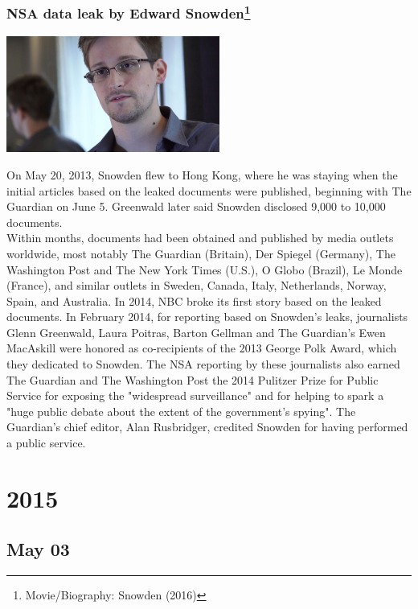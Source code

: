 \documentclass[11pt]{report}
\begin{document}
\subsection{NSA data leak by Edward Snowden\protect\footnote{Movie/Biography: Snowden (2016)}}
\vspace{2mm}\begin{center}\includegraphics[width=7cm]{./img/edwardSnowden.jpg}\end{center}
On May 20, 2013, Snowden flew to Hong Kong, where he was staying when the initial articles based on the leaked documents were published, beginning with The Guardian on June 5. Greenwald later said Snowden disclosed 9,000 to 10,000 documents.\\
\indent Within months, documents had been obtained and published by media outlets worldwide, most notably The Guardian (Britain), Der Spiegel (Germany), The Washington Post and The New York Times (U.S.), O Globo (Brazil), Le Monde (France), and similar outlets in Sweden, Canada, Italy, Netherlands, Norway, Spain, and Australia. In 2014, NBC broke its first story based on the leaked documents. In February 2014, for reporting based on Snowden's leaks, journalists Glenn Greenwald, Laura Poitras, Barton Gellman and The Guardian's Ewen MacAskill were honored as co-recipients of the 2013 George Polk Award, which they dedicated to Snowden. The NSA reporting by these journalists also earned The Guardian and The Washington Post the 2014 Pulitzer Prize for Public Service for exposing the "widespread surveillance" and for helping to spark a "huge public debate about the extent of the government's spying". The Guardian's chief editor, Alan Rusbridger, credited Snowden for having performed a public service.

\chapter{2015}
\section{May 03}
\end{document}
